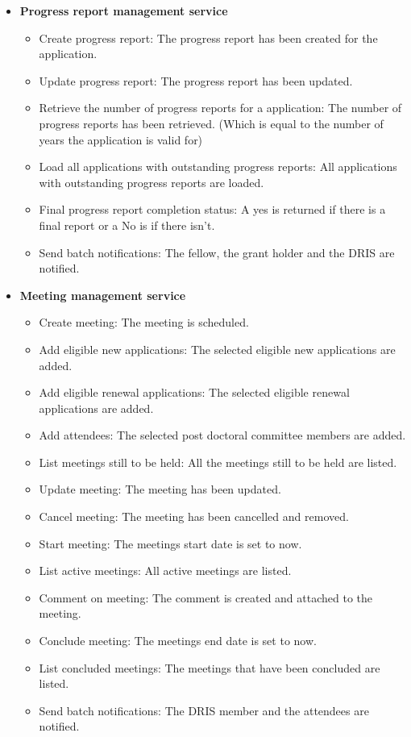 \documentclass[12pt]{article}
\begin{document}
\begin{itemize}
	\item \textbf{Progress report management service}
		\begin{itemize}
			\item Create progress report: The progress report has been created for the application.
			\item Update progress report: The progress report has been updated.
			\item Retrieve the number of progress reports for a application: The number of progress reports has been retrieved. (Which is equal to the number of years the application is valid for)
			\item Load all applications with outstanding progress reports: All applications with outstanding progress reports are loaded.
			\item Final progress report completion status: A yes is returned if there is a final report or a No is if there isn't.
			\item Send batch notifications: The fellow, the grant holder and the DRIS are notified.						
		\end{itemize}

	\item \textbf{Meeting management service}
		\begin{itemize}			
			\item Create meeting: The meeting is scheduled.
			\item Add eligible new applications: The selected eligible new applications are added.
			\item Add eligible renewal applications: The selected eligible renewal applications are added.
			\item Add attendees: The selected post doctoral committee members are added.
			\item List meetings still to be held: All the meetings still to be held are listed.
			\item Update meeting: The meeting has been updated.
			\item Cancel meeting: The meeting has been cancelled and removed.
			\item Start meeting: The meetings start date is set to now.
			\item List active meetings: All active meetings are listed.
			\item Comment on meeting: The comment is created and attached to the meeting.
			\item Conclude meeting: The meetings end date is set to now.	
			\item List concluded meetings: The meetings that have been concluded are listed.
			\item Send batch notifications: The DRIS member and the attendees are notified.						
		\end{itemize}


\end{itemize}
\end{document}
